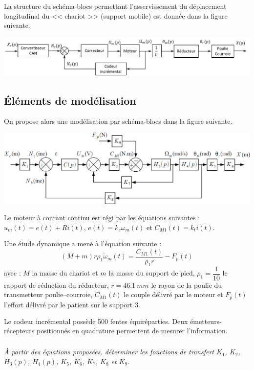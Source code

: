 \documentclass[10pt,fleqn]{article} %
\begin{document}
\begin{multicols}{2}
La structure du schéma-blocs permettant l'asservissement du déplacement longitudinal du << chariot >> (support mobile) est donnée dans la figure suivante.


\begin{center}
\includegraphics[width=\linewidth]{images/fig_03}
\end{center}

\subsection*{Éléments de modélisation}
On propose alors une modélisation par schéma-blocs dans la figure suivante. 
\begin{center}
\includegraphics[width=\linewidth]{images/fig_04}
\end{center}

Le moteur à courant continu est régi par les équations suivantes :
$ u_m(t)=e(t)+Ri(t)$, $e(t)=k_e\omega_m(t)$ et $C_{M1}(t)=k_t i(t)$. 

Une étude dynamique a mené à l'équation suivante : 
$$\left(M+m\right)r\rho_1 \dot{\omega}_m(t)=\dfrac{C_{M1}(t)}{\rho_1 r}-F_p(t)$$ avec : $M$ la masse du chariot et $m$ la masse du support de pied, $\rho_1=\dfrac{1}{10}$ le rapport de réduction du réducteur, $r=\SI{46,1}{mm}$ le rayon de la poulie du transmetteur poulie--courroie, $C_{M1}(t)$ le couple délivré par le moteur et $F_p(t)$ l'effort délivré par le patient sur le support 3. 

Le codeur incrémental possède 500 fentes équiréparties. Deux émetteurs-récepteurs positionnés en quadrature permettent de mesurer l'information. 

\subparagraph{}\textit{À partir des équations proposées, déterminer les fonctions de transfert $K_1$, $K_2$, $H_3(p)$, $H_4(p)$,  $K_5$, $K_6$, $K_7$, $K_8$ et $K_9$.}
\ifprof
\begin{corrige}~\\
\end{corrige}
\else
\fi


\end{multicols}
\end{document}
